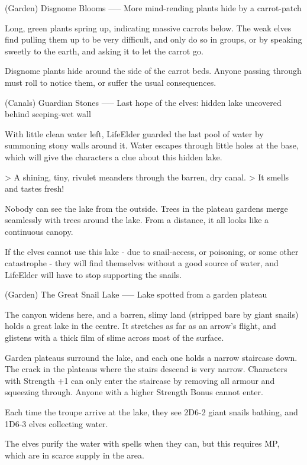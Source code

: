(Garden) Disgnome Blooms
-----
{More mind-rending plants hide by a carrot-patch}

Long, green plants spring up, indicating massive carrots below.
The weak elves find pulling them up to be very difficult, and only do so in groups, or by speaking sweetly to the earth, and asking it to let the carrot go.

Disgnome plants hide around the side of the carrot beds.
Anyone passing through must roll to notice them, or suffer the usual consequences.

(Canals) Guardian Stones
-----
{Last hope of the elves: hidden lake uncovered behind seeping-wet wall}

With little clean water left, LifeElder guarded the last pool of water by summoning stony walls around it.
Water escapes through little holes at the base, which will give the characters a clue about this hidden lake.

> A shining, tiny, rivulet meanders through the barren, dry canal.
> It smells and tastes fresh!

Nobody can see the lake from the outside.
Trees in the plateau gardens merge seamlessly with trees around the lake.
From a distance, it all looks like a continuous canopy.

If the elves cannot use this lake - due to snail-access, or poisoning, or some other catastrophe - they will find themselves without a good source of water, and LifeElder will have to stop supporting the snails.

(Garden) The Great Snail Lake
-----
{Lake spotted from a garden plateau}

The canyon widens here, and a barren, slimy land (stripped bare by giant snails) holds a great lake in the centre.
It stretches as far as an arrow's flight, and glistens with a thick film of slime across most of the surface.

Garden plateaus surround the lake, and each one holds a narrow staircase down.
The crack in the plateaus where the stairs descend is very narrow.
Characters with Strength +1 can only enter the staircase by removing all armour and squeezing through.
Anyone with a higher Strength Bonus cannot enter.

Each time the troupe arrive at the lake,
they see 2D6-2 giant snails bathing, and 1D6-3 elves collecting water.

The elves purify the water with spells when they can, but this requires MP, which are in scarce supply in the area.

